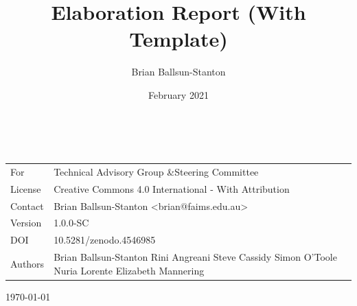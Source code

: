 \documentclass[a4paper,headings=small fontsize=10pt]{scrreprt}
\title{Elaboration Report (With Template)}
\author{Brian Ballsun-Stanton}
\date{February 2021}
\begin{document}
\begin{titlepage}
~
\vspace{1cm}%



\parbox{.6\textwidth}{
\begin{flushleft}
\selectfont
\fontsize{30pt}{36pt}%
\bfseries
\selectfont%
\textcolor{faimsblue}{%
}
\end{flushleft}
}

\vspace{-5mm}

\parbox{.7\textwidth}{
\begin{flushleft}

\fontsize{18pt}{21pt}%
%
\selectfont%
\textcolor{faimsblue}{%
}


\end{flushleft}

{\renewcommand{\arraystretch}{1.5}

\vspace{1cm}

%
\selectfont%
\begin{tabular}{@{}l p{}}
\textcolor{faimsblue}{
For} & Technical Advisory Group \&\newline Steering Committee \\
\textcolor{faimsblue}{License} & Creative Commons 4.0 International - With Attribution \\
\textcolor{faimsblue}{Contact} & Brian Ballsun-Stanton \newline <brian@faims.edu.au>
\\
\textcolor{faimsblue}{Version} & 1.0.0-SC
\\
\textcolor{faimsblue}{DOI} & 10.5281/zenodo.4546985
\\
\textcolor{faimsblue}{Authors} & Brian Ballsun-Stanton \newline
Rini Angreani \newline
Steve Cassidy \newline
Simon O’Toole \newline
Nuria Lorente \newline
Elizabeth Mannering


\end{tabular}

}}

\vfill
\fontsize{16pt}{19pt}%
%
\selectfont%
\textcolor{faimsblue}{%
\today
}


\end{titlepage}
\end{document}
